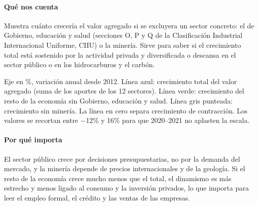 \paragraph{Qué nos cuenta}
Muestra cuánto crecería el valor agregado si se excluyera un sector concreto: el de Gobierno, educación y salud (secciones O, P y Q de la Clasificación Industrial Internacional Uniforme, CIIU) o la minería. Sirve para saber si el crecimiento total está sostenido por la actividad privada y diversificada o descansa en el sector público o en los hidrocarburos y el carbón.

\begin{leer}
Eje en \%, variación anual desde 2012. Línea azul: crecimiento total del valor agregado (suma de los aportes de los 12 sectores). Línea verde: crecimiento del resto de la economía sin Gobierno, educación y salud. Línea gris punteada: crecimiento sin minería. La línea en cero separa crecimiento de contracción. Los valores se recortan entre −12\% y 16\% para que 2020–2021 no aplasten la escala.
\end{leer}

\paragraph{Por qué importa}
El sector público crece por decisiones presupuestarias, no por la demanda del mercado, y la minería depende de precios internacionales y de la geología. Si el resto de la economía crece mucho menos que el total, el dinamismo es más estrecho y menos ligado al consumo y la inversión privados, lo que importa para leer el empleo formal, el crédito y las ventas de las empresas.

